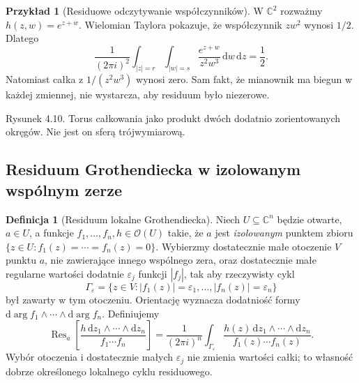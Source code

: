 \documentclass[11pt,a4paper,openany]{report}
\numberwithin{equation}{section}
\theoremstyle{plain}
\theoremstyle{definition}
\newtheorem{definicja}[twierdzenie]{Definicja}
\newtheorem{przyklad}[twierdzenie]{Przykład}
\theoremstyle{remark}
\newcommand{\C}{\mathbb C}
\begin{document}
\begin{przyklad}[Residuowe odczytywanie współczynników]
W $\C^2$ rozważmy $h(z,w)=e^{z+w}$.
Wielomian Taylora pokazuje, że współczynnik $zw^2$ wynosi $1/2$.
Dlatego
\[
\frac{1}{(2\pi i)^2}\int_{|z|=r}\int_{|w|=s}
\frac{e^{z+w}}{z^2w^3}\,\mathrm dw\,\mathrm dz=\frac12.
\]
Natomiast całka z $1/(z^2w^3)$ wynosi zero. Sam fakt,
że mianownik ma biegun w każdej zmiennej, nie wystarcza,
aby residuum było niezerowe.
\end{przyklad}

\begin{center}

{\small Rysunek 4.10. Torus całkowania jako produkt dwóch dodatnio
zorientowanych okręgów. Nie jest on sferą trójwymiarową.}\par
\end{center}

\subsection{Residuum Grothendiecka w izolowanym wspólnym zerze}
\label{subsec:ga4-groth-res}

\begin{definicja}[Residuum lokalne Grothendiecka]
\label{def:ga4-groth-res}
Niech $U\subseteq\C^n$ będzie otwarte, $a\in U$, a funkcje
$f_1,\ldots,f_n,h\in\mathcal O(U)$ takie, że $a$ jest
\emph{izolowanym} punktem zbioru
$\{z\in U:f_1(z)=\cdots=f_n(z)=0\}$.
Wybierzmy dostatecznie małe otoczenie $V$ punktu $a$,
nie zawierające innego wspólnego zera, oraz dostatecznie małe regularne
wartości dodatnie $\varepsilon_j$ funkcji $|f_j|$,
tak aby rzeczywisty cykl
\[
\Gamma_\varepsilon=\{z\in V:|f_1(z)|=\varepsilon_1,\ldots,
|f_n(z)|=\varepsilon_n\}
\]
był zawarty w tym otoczeniu.
Orientację wyznacza dodatniość formy
$\mathrm d\arg f_1\wedge\cdots\wedge\mathrm d\arg f_n$.
Definiujemy
\[
\operatorname{Res}_a\!\left[\frac{h\,\mathrm dz_1\wedge\cdots
\wedge\mathrm dz_n}{f_1\cdots f_n}\right]
=\frac1{(2\pi i)^n}\int_{\Gamma_\varepsilon}
\frac{h(z)\,\mathrm dz_1\wedge\cdots\wedge\mathrm dz_n}
{f_1(z)\cdots f_n(z)}.
\]
Wybór otoczenia i dostatecznie małych $\varepsilon_j$
nie zmienia wartości całki; to własność dobrze określonego
lokalnego cyklu residuowego.
\end{definicja}
\end{document}
